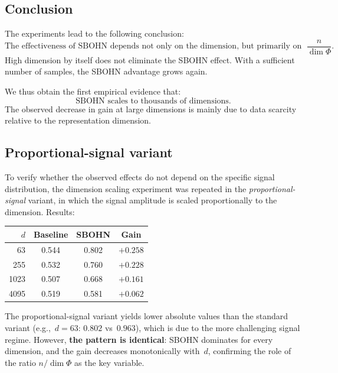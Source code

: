 \documentclass[11pt,a4paper]{report}
\begin{document}
\subsection{Conclusion}

The experiments lead to the following conclusion:
\[
\boxed{\text{The effectiveness of SBOHN depends not only on the dimension, but primarily on the ratio}\;\; \frac{n}{\dim \Phi}.}
\]
High dimension by itself does not eliminate the SBOHN effect. With a sufficient number of samples, the SBOHN advantage grows again.

We thus obtain the first empirical evidence that:
\[
\boxed{\text{SBOHN scales to thousands of dimensions.}}
\]
The observed decrease in gain at large dimensions is mainly due to data scarcity relative to the representation dimension.

\subsection{Proportional-signal variant}

To verify whether the observed effects do not depend on the specific signal distribution, the dimension scaling experiment was repeated in the \emph{proportional-signal} variant, in which the signal amplitude is scaled proportionally to the dimension. Results:

\begin{center}
\begin{tabular}{rccc}
\toprule
$d$ & Baseline & SBOHN & Gain \\
\midrule
63 & 0.544 & 0.802 & $+0.258$ \\
255 & 0.532 & 0.760 & $+0.228$ \\
1023 & 0.507 & 0.668 & $+0.161$ \\
4095 & 0.519 & 0.581 & $+0.062$ \\
\bottomrule
\end{tabular}
\end{center}

The proportional-signal variant yields lower absolute values than the standard variant (e.g.,~$d=63$: $0.802$ vs~$0.963$), which is due to the more challenging signal regime. However, \textbf{the pattern is identical}: SBOHN dominates for every dimension, and the gain decreases monotonically with~$d$, confirming the role of the ratio $n/\dim\Phi$ as the key variable.




\end{document}
